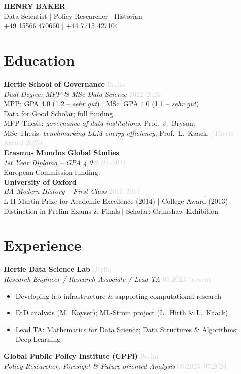 \documentclass[11pt,a4paper]{article}
\newcommand{\entry}[4]{%
    \textbf{#1} \hfill \textcolor{lightgray}{#2}\\
    \textit{#3} \hfill \textcolor{lightgray}{#4}\\[0.3em]
}
\newcommand{\entrydetail}[1]{%
    \hspace{1em}#1\\[0.2em]
}
\begin{document}
\begin{center}
    {\Huge\bfseries HENRY BAKER}\\[0.5em]
    {\color{lightgray}Data Scientist | Policy Researcher | Historian}\\[0.3em]
    {\small +49 15566 470660 \quad | \quad +44 7715 427104}
\end{center}

\section{Education}

\entry{Hertie School of Governance}{Berlin}{Dual Degree: MPP \& MSc Data Science}{2022--2025}
\entrydetail{MPP: GPA 4.0 (1.2 -- \textit{sehr gut}) | MSc: GPA 4.0 (1.1 -- \textit{sehr gut})}
\entrydetail{Data for Good Scholar; full funding.}
\entrydetail{MPP Thesis: \textit{governance of data institutions}, Prof.\ J.\ Bryson.}
\entrydetail{MSc Thesis: \textit{benchmarking LLM energy efficiency}, Prof.\ L.\ Kaack. \textcolor{lightgray}{(Thesis Award 2025)}}

\entry{Erasmus Mundus Global Studies}{}{1st Year Diploma -- GPA 4.0}{2021--2022}
\entrydetail{European Commission funding.}

\entry{University of Oxford}{}{BA Modern History -- First Class}{2011--2014}
\entrydetail{L H Martin Prize for Academic Excellence (2014) | College Award (2013)}
\entrydetail{Distinction in Prelim Exams \& Finals | Scholar: Grimshaw Exhibition}

\section{Experience}

\entry{Hertie Data Science Lab}{Berlin}{Research Engineer / Research Associate / Lead TA}{05.2023--present}
\begin{itemize}
    \item Developing lab infrastructure \& supporting computational research
    \item DiD analysis (M.\ Kayser); ML-Strom project (L.\ Hirth \& L.\ Kaack)
    \item Lead TA: Mathematics for Data Science; Data Structures \& Algorithms; Deep Learning
\end{itemize}

\vspace{0.5em}
\entry{Global Public Policy Institute (GPPi)}{Berlin}{Policy Researcher, Foresight \& Future-oriented Analysis}{08.2023--07.2024}
\end{document}
